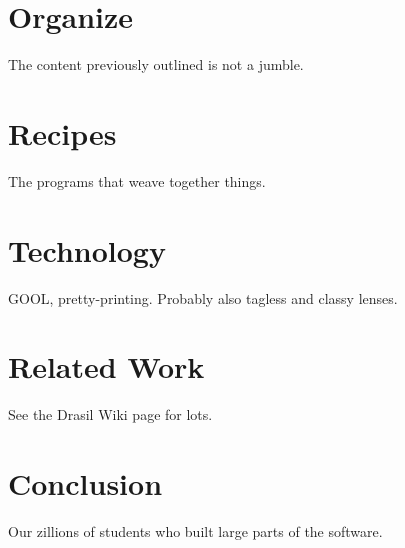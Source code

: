\documentclass[english,submission]{programming}
\begin{document}
\section{Organize}
\label{sec:organize}

The content previously outlined is not a jumble.

\section{Recipes}
\label{sec:recipes}

The programs that weave together things.

\section{Technology}
\label{sec:tech}

GOOL, pretty-printing. Probably also tagless and classy lenses.

\section{Related Work}
\label{sec:relwork}

See the Drasil Wiki page for lots.

\section{Conclusion}
\label{sec:conc}

\acks
Our zillions of students who built large parts of the software.

\end{document}
